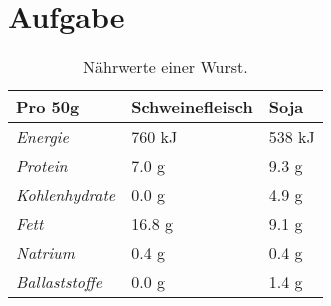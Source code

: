 \documentclass[a4paper,12pt]{article}
\begin{document}

\section{Aufgabe}

\begin{table}[ht] 
	\centering
	\begin{tabular}{l l l}
		\toprule
		\textbf{Pro 50g} & \textbf{Schweinefleisch} & \textbf{Soja} \\
		\midrule
		\textit{Energie} & 760 kJ & 538 kJ \\
		\textit{Protein} & 7.0 g & 9.3 g \\
		\textit{Kohlenhydrate} & 0.0 g & 4.9 g \\
		\textit{Fett} & 16.8 g & 9.1 g \\
		\textit{Natrium} & 0.4 g & 0.4 g \\
		\textit{Ballaststoffe} & 0.0 g & 1.4 g \\
		\bottomrule
	\end{tabular}
	\caption{Nährwerte einer Wurst.}
\end{table}
\end{document}
